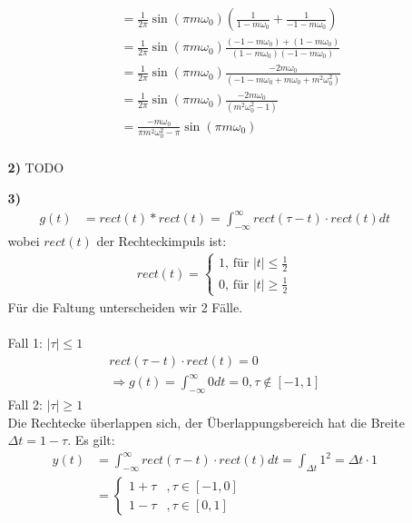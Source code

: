 \documentclass[a4paper,11pt]{article}
\begin{document}
\begin{enumerate}
\begin{enumerate}
\begin{enumerate}
\begin{align*}
					   &=\frac{1}{2\pi}\sin(\pi m\omega_0)(\frac{1}{1- m\omega_0}+\frac{1}{-1-m\omega_0})\\
					   &=\frac{1}{2\pi}\sin(\pi m\omega_0)\frac{(-1-m\omega_0)+(1- m\omega_0)}{(1- m\omega_0)(-1-m\omega_0)}\\
					   &=\frac{1}{2\pi}\sin(\pi m\omega_0)\frac{-2m\omega_0}{(-1-m\omega_0+m\omega_0+m^2\omega_0^2)}\\
					   &=\frac{1}{2\pi}\sin(\pi m\omega_0)\frac{-2m\omega_0}{(m^2\omega_0^2-1)}\\
					   &=\frac{-m\omega_0}{\pi m^2\omega_0^2-\pi}\sin(\pi m\omega_0)\\
				\end{align*}
				\end{enumerate}
			\item[\textbf{2)}]
				TODO
			\item[\textbf{3)}]
			\begin{align*}
			g(t) &= rect(t) * rect(t) = \int_{- \infty}^{\infty}rect(\tau - t)\cdot rect(t)dt
			\end{align*}
			wobei $rect(t)$ der Rechteckimpuls ist:
			\begin{align*}
			rect(t) = 
			\begin{cases}
			1 \text{, für } |t| \leq \frac{1}{2} \\
			0 \text{, für } |t| \geq \frac{1}{2}
			\end{cases}
			\end{align*}
			Für die Faltung unterscheiden wir 2 Fälle. \\ \\
			Fall 1: $|\tau| \le 1$ \\
			\begin{align*}
			rect(\tau - t)\cdot rect(t) = 0 \\
			\Rightarrow g(t) = \int_{- \infty}^{\infty} 0 dt = 0 , \tau \not\in [-1, 1]
			\end{align*}
			Fall 2: $|\tau| \ge 1$ \\
			Die Rechtecke überlappen sich, der Überlappungsbereich hat die Breite $\Delta t = 1 - \tau$. Es gilt:
			\begin{align*}
			y(t) &= \int_{- \infty}^{\infty}rect(\tau - t)\cdot rect(t)dt = \int_{\Delta t} 1^2 = \Delta t \cdot 1 \\
			&= \begin{cases}
			1 + \tau &, \tau\in [-1, 0] \\
			1 - \tau &, \tau\in [0,1]
			\end{cases}
			\end{align*}

\end{enumerate}
\end{enumerate}
\end{document}
